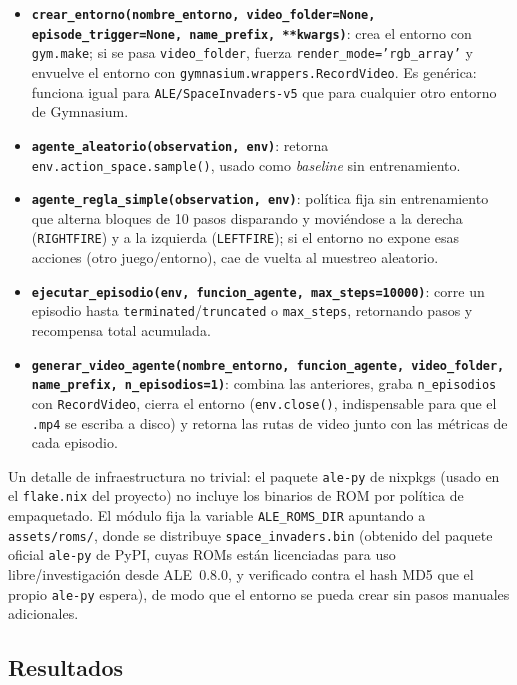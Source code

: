 \documentclass[11pt]{article}
\begin{document}
\begin{itemize}[leftmargin=1.4em, itemsep=1pt, topsep=2pt]
  \item \textbf{\texttt{crear\_entorno(nombre\_entorno, video\_folder=None, episode\_trigger=None,
  name\_prefix, **kwargs)}}: crea el entorno con \texttt{gym.make}; si se pasa
  \texttt{video\_folder}, fuerza \texttt{render\_mode='rgb\_array'} y envuelve el entorno con
  \texttt{gymnasium.wrappers.RecordVideo}. Es gen\'erica: funciona igual para
  \texttt{ALE/SpaceInvaders-v5} que para cualquier otro entorno de Gymnasium.
  \item \textbf{\texttt{agente\_aleatorio(observation, env)}}: retorna
  \texttt{env.action\_space.sample()}, usado como \textit{baseline} sin entrenamiento.
  \item \textbf{\texttt{agente\_regla\_simple(observation, env)}}: pol\'itica fija sin
  entrenamiento que alterna bloques de 10 pasos disparando y movi\'endose a la derecha
  (\texttt{RIGHTFIRE}) y a la izquierda (\texttt{LEFTFIRE}); si el entorno no expone esas acciones
  (otro juego/entorno), cae de vuelta al muestreo aleatorio.
  \item \textbf{\texttt{ejecutar\_episodio(env, funcion\_agente, max\_steps=10000)}}: corre un
  episodio hasta \texttt{terminated}/\texttt{truncated} o \texttt{max\_steps}, retornando pasos y
  recompensa total acumulada.
  \item \textbf{\texttt{generar\_video\_agente(nombre\_entorno, funcion\_agente, video\_folder,
  name\_prefix, n\_episodios=1)}}: combina las anteriores, graba \texttt{n\_episodios} con
  \texttt{RecordVideo}, cierra el entorno (\texttt{env.close()}, indispensable para que el
  \texttt{.mp4} se escriba a disco) y retorna las rutas de video junto con las m\'etricas de cada
  episodio.
\end{itemize}

Un detalle de infraestructura no trivial: el paquete \texttt{ale-py} de nixpkgs (usado en el
\texttt{flake.nix} del proyecto) no incluye los binarios de ROM por pol\'itica de empaquetado. El
m\'odulo fija la variable \texttt{ALE\_ROMS\_DIR} apuntando a \texttt{assets/roms/}, donde se
distribuye \texttt{space\_invaders.bin} (obtenido del paquete oficial \texttt{ale-py} de PyPI, cuyas
ROMs est\'an licenciadas para uso libre/investigaci\'on desde ALE~0.8.0, y verificado contra el hash
MD5 que el propio \texttt{ale-py} espera), de modo que el entorno se pueda crear sin pasos manuales
adicionales.

\subsection*{Resultados}
\end{document}
